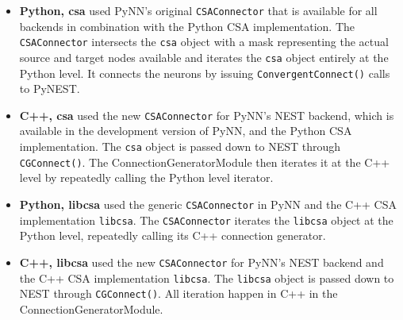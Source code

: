 \documentclass{frontiersSCNS} %
\begin{document}
\begin{itemize}
\item \textbf{Python, csa} used PyNN's original \verb|CSAConnector|
  that is available for all backends in combination with the Python
  CSA implementation. The \verb|CSAConnector| intersects the
  \verb|csa| object with a mask representing the actual source and
  target nodes available and iterates the \verb|csa| object entirely
  at the Python level. It connects the neurons by issuing
  \verb|ConvergentConnect()| calls to PyNEST.
\item \textbf{C++, csa} used the new \verb|CSAConnector| for PyNN's NEST
  backend, which is available in the development version of PyNN, and the
  Python CSA implementation. The \verb|csa| object is passed down to NEST
  through \verb|CGConnect()|. The ConnectionGeneratorModule then
  iterates it at the C++ level by repeatedly calling the Python level
  iterator.
\item \textbf{Python, libcsa} used the generic \verb|CSAConnector| in
  PyNN and the C++ CSA implementation \verb|libcsa|. The
  \verb|CSAConnector| iterates the \verb|libcsa| object at the Python
  level, repeatedly calling its C++ connection generator.
\item \textbf{C++, libcsa} used the new \verb|CSAConnector| for PyNN's
  NEST backend and the C++ CSA implementation \verb|libcsa|. The
  \verb|libcsa| object is passed down to NEST through
  \verb|CGConnect()|. All iteration happen in C++ in the
  ConnectionGeneratorModule.
\end{itemize}
\end{document}
